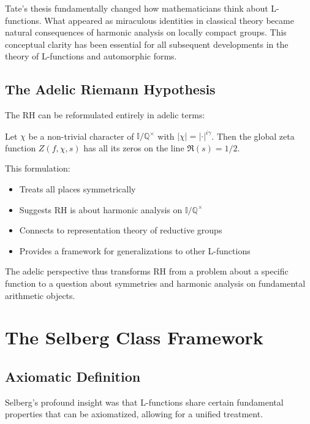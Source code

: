 \begin{remark}
Tate's thesis fundamentally changed how mathematicians think about L-functions. What appeared as miraculous identities in classical theory became natural consequences of harmonic analysis on locally compact groups. This conceptual clarity has been essential for all subsequent developments in the theory of L-functions and automorphic forms.
\end{remark}

\subsection{The Adelic Riemann Hypothesis}

The RH can be reformulated entirely in adelic terms:

\begin{conjecture}[Adelic RH]
Let $\chi$ be a non-trivial character of $\mathbb{I}/\mathbb{Q}^{\times}$ with $|\chi| = |\cdot|^{i\gamma}$. Then the global zeta function $Z(f, \chi, s)$ has all its zeros on the line $\Re(s) = 1/2$.
\end{conjecture}

This formulation:
\begin{itemize}
\item Treats all places symmetrically
\item Suggests RH is about harmonic analysis on $\mathbb{I}/\mathbb{Q}^{\times}$
\item Connects to representation theory of reductive groups
\item Provides a framework for generalizations to other L-functions
\end{itemize}

The adelic perspective thus transforms RH from a problem about a specific function to a question about symmetries and harmonic analysis on fundamental arithmetic objects.

\section{The Selberg Class Framework}
\label{sec:selberg-class}

\subsection{Axiomatic Definition}

Selberg's profound insight was that L-functions share certain fundamental properties that can be axiomatized, allowing for a unified treatment.

